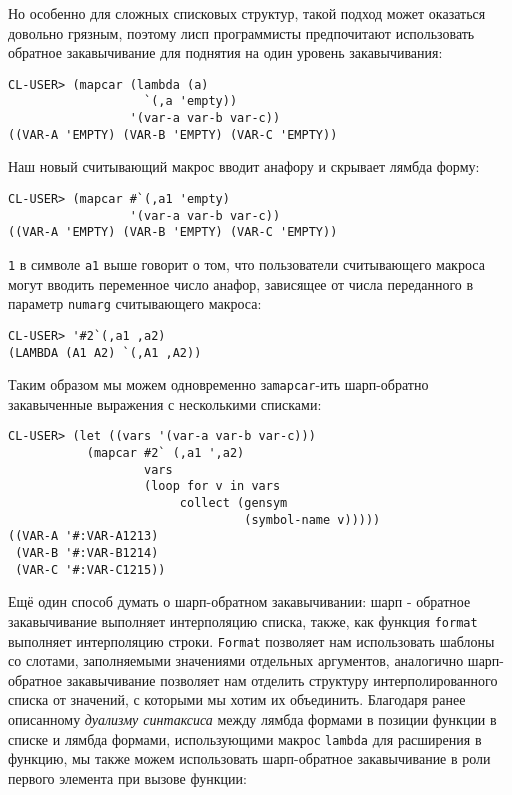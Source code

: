 Но особенно для сложных списковых структур, такой подход может оказаться довольно грязным, поэтому лисп программисты предпочитают использовать обратное закавычивание для поднятия на один уровень закавычивания:

\begin{verbatim}
CL-USER> (mapcar (lambda (a)
                   `(,a 'empty))
                 '(var-a var-b var-c))
((VAR-A 'EMPTY) (VAR-B 'EMPTY) (VAR-C 'EMPTY))
\end{verbatim}

Наш новый считывающий макрос вводит анафору и скрывает лямбда форму:

\begin{verbatim}
CL-USER> (mapcar #`(,a1 'empty)
                 '(var-a var-b var-c))
((VAR-A 'EMPTY) (VAR-B 'EMPTY) (VAR-C 'EMPTY))
\end{verbatim}

\verb"1" в символе \verb"a1" выше говорит о том, что пользователи считывающего макроса могут вводить переменное число анафор, зависящее от числа переданного в параметр \verb"numarg" считывающего макроса:

\begin{verbatim}
CL-USER> '#2`(,a1 ,a2)
(LAMBDA (A1 A2) `(,A1 ,A2))
\end{verbatim}

Таким образом мы можем одновременно за\verb"mapcar"-ить шарп-обратно закавыченные выражения с несколькими списками:

\begin{verbatim}
CL-USER> (let ((vars '(var-a var-b var-c)))
           (mapcar #2` (,a1 ',a2)
                   vars
                   (loop for v in vars
                        collect (gensym
                                 (symbol-name v)))))
((VAR-A '#:VAR-A1213) 
 (VAR-B '#:VAR-B1214) 
 (VAR-C '#:VAR-C1215))
\end{verbatim}

Ещё один способ думать о шарп-обратном закавычивании: шарп - обратное закавычивание выполняет интерполяцию списка, также, как функция \verb"format" выполняет интерполяцию строки. \verb"Format" позволяет нам использовать шаблоны со слотами, заполняемыми значениями отдельных аргументов, аналогично шарп-обратное закавычивание позволяет нам отделить структуру интерполированного списка от значений, с которыми мы хотим их объединить. Благодаря ранее описанному \emph{дуализму синтаксиса} между лямбда формами в позиции функции в списке и лямбда формами, использующими макрос \verb"lambda" для расширения в функцию, мы также можем использовать шарп-обратное закавычивание в роли первого элемента при вызове функции:

